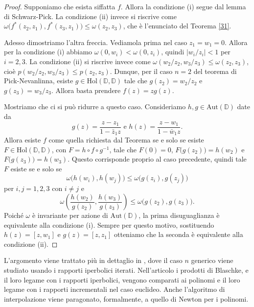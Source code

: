 \begin{proof}
  Supponiamo che esista siffatta $f$. Allora la condizione (i) segue dal lemma di Schwarz-Pick. La condizione (ii) invece si riscrive come $\omega\bigl(f^*(z_2,z_1),f^*(z_3,z_1)\bigr) \le \omega(z_2,z_3)$, che è l'enunciato del Teorema \ref{31}.

  Adesso dimostriamo l'altra freccia. Vediamola prima nel caso $z_1=w_1=0$. Allora per la condizione (i) abbiamo $\omega(0,w_i) < \omega(0,z_i)$, quindi $|w_i/z_i|<1$ per $i=2,3$. La condizione (ii) si riscrive invece come $\omega(w_2/z_2,w_3/z_3) \le \omega(z_2,z_3)$, cioè $p(w_2/z_2,w_3/z_3) \le p(z_2,z_3)$.
  Dunque, per il caso $n=2$ del teorema di Pick-Nevanlinna, esiste $g \in \text{Hol}(\mathbb{D},\mathbb{D})$ tale che $g(z_2)=w_2/z_2$ e $g(z_3)=w_3/z_3$. Allora basta prendere $f(z)=zg(z)$.

   Mostriamo che ci si può ridurre a questo caso. Consideriamo $h, g \in \text{Aut}(\mathbb{D})$ date da
   $$g(z)=\frac{z-z_1}{1-\bar{z}_1z} \,\, \text{e} \,\, h(z)=\frac{z-w_1}{1-\bar{w}_1z}.$$
   Allora esiste $f$ come quella richiesta dal Teorema se e solo se esiste $F \in \text{Hol}(\mathbb{D},\mathbb{D})$, con $F=h \circ f \circ g^{-1}$, tale che $F(0)=0$, $F\bigl(g(z_2)\bigr)=h(w_2)$ e $F\bigl(g(z_3)\bigr)=h(w_3)$.
   Questo corrisponde proprio al caso precedente, quindi tale $F$ esiste se e solo se
   $$\omega\bigl(h(w_i),h(w_j)\bigr) \le \omega\bigl(g(z_i),g(z_j)\bigr)$$
   per $i,j=1,2,3$ con $i\not=j$ e
   $$\omega\left(\frac{h(w_2)}{g(z_2)},\frac{h(w_3)}{g(z_3)}\right) \le \omega\bigl(g(z_2),g(z_3)\bigr).$$
   Poiché $\omega$ è invariante per azione di $\text{Aut}(\mathbb{D})$, la prima disuguaglianza è equivalente alla condizione (i). Sempre per questo motivo, sostituendo $h(z)=[z,w_1]$ e $g(z)=[z,z_1]$ otteniamo che la seconda è equivalente alla condizione (ii).
\end{proof}

L'argomento viene trattato più in dettaglio in \cite{BRW}, dove il caso $n$ generico viene studiato usando i rapporti iperbolici iterati. Nell'articolo i prodotti di Blaschke, e il loro legame con i rapporti iperbolici, vengono comparati ai polinomi e il loro legame con i rapporti incrementali nel caso euclideo. Anche l'algoritmo di interpolazione viene paragonato, formalmente, a quello di Newton per i polinomi.
